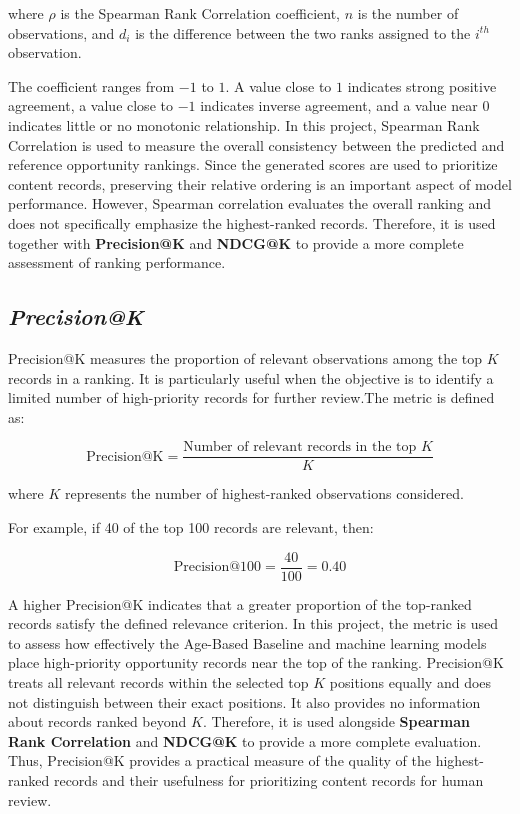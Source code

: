 \documentclass[12pt,a4paper]{report}
\begin{document}
where $\rho$ is the Spearman Rank Correlation coefficient, $n$ is the number of observations, and $d_i$ is the difference between the two ranks assigned to the $i^{th}$ observation.

The coefficient ranges from $-1$ to $1$. A value close to $1$ indicates strong positive agreement, a value close to $-1$ indicates inverse agreement, and a value near $0$ indicates little or no monotonic relationship. In this project, Spearman Rank Correlation is used to measure the overall consistency between the predicted and reference opportunity rankings. Since the generated scores are used to prioritize content records, preserving their relative ordering is an important aspect of model performance. However, Spearman correlation evaluates the overall ranking and does not specifically emphasize the highest-ranked records. Therefore, it is used together with \textbf{Precision@K} and \textbf{NDCG@K} to provide a more complete assessment of ranking performance.

\subsection{\textit{Precision@K}}
Precision@K measures the proportion of relevant observations among the top $K$ records in a ranking. It is particularly useful when the objective is to identify a limited number of high-priority records for further review.The metric is defined as:

\begin{equation}
\text{Precision@K} =
\frac{\text{Number of relevant records in the top } K}
{K}
\end{equation}

where $K$ represents the number of highest-ranked observations considered.

For example, if 40 of the top 100 records are relevant, then:

\begin{equation}
\text{Precision@100} =
\frac{40}{100} = 0.40
\end{equation}

A higher Precision@K indicates that a greater proportion of the top-ranked records satisfy the defined relevance criterion. In this project, the metric is used to assess how effectively the Age-Based Baseline and machine learning models place high-priority opportunity records near the top of the ranking.
Precision@K treats all relevant records within the selected top $K$ positions equally and does not distinguish between their exact positions. It also provides no information about records ranked beyond $K$. Therefore, it is used alongside \textbf{Spearman Rank Correlation} and \textbf{NDCG@K} to provide a more complete evaluation. Thus, Precision@K provides a practical measure of the quality of the highest-ranked records and their usefulness for prioritizing content records for human review.
\end{document}
